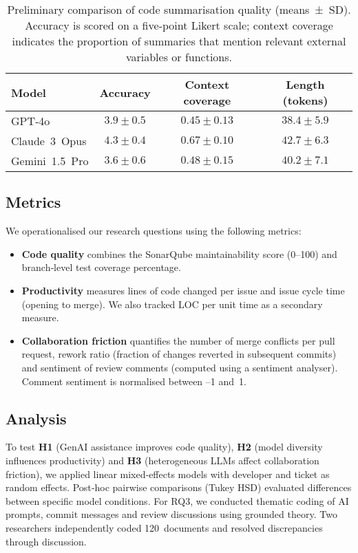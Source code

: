 \documentclass[conference]{IEEEtran}
\begin{document}
\begin{table}[h]
\centering
\caption{Preliminary comparison of code summarisation quality (means ± SD).  Accuracy is scored on a five‑point Likert scale; context coverage indicates the proportion of summaries that mention relevant external variables or functions.}
\label{tab:prelim}
\begin{tabular}{lccc}
\toprule
\textbf{Model} & \textbf{Accuracy} & \textbf{Context coverage} & \textbf{Length (tokens)} \\
\midrule
GPT‑4o & $3.9\pm0.5$ & $0.45\pm0.13$ & $38.4\pm5.9$ \\
Claude 3 Opus & $4.3\pm0.4$ & $0.67\pm0.10$ & $42.7\pm6.3$ \\
Gemini 1.5 Pro & $3.6\pm0.6$ & $0.48\pm0.15$ & $40.2\pm7.1$ \\
\bottomrule
\end{tabular}
\end{table}


\subsection{Metrics}
We operationalised our research questions using the following metrics:
\begin{itemize}
  \item \textbf{Code quality} combines the SonarQube maintainability score (0–100) and branch‑level test coverage percentage.
  \item \textbf{Productivity} measures lines of code changed per issue and issue cycle time (opening to merge).  We also tracked LOC per unit time as a secondary measure.
  \item \textbf{Collaboration friction} quantifies the number of merge conflicts per pull request, rework ratio (fraction of changes reverted in subsequent commits) and sentiment of review comments (computed using a sentiment analyser).  Comment sentiment is normalised between –1 and 1.
\end{itemize}

\subsection{Analysis}
To test \textbf{H1} (GenAI assistance improves code quality), \textbf{H2} (model diversity influences productivity) and \textbf{H3} (heterogeneous LLMs affect collaboration friction), we applied linear mixed‑effects models with developer and ticket as random effects.  Post‑hoc pairwise comparisons (Tukey HSD) evaluated differences between specific model conditions.  For RQ3, we conducted thematic coding of AI prompts, commit messages and review discussions using grounded theory.  Two researchers independently coded 120 documents and resolved discrepancies through discussion.
\end{document}

